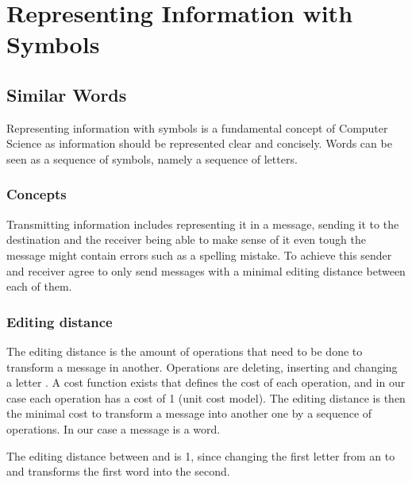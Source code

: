 \chapter{Representing Information with Symbols}
\label{chapter:representing_information_with_symbols}

\section{Similar Words}

Representing information with symbols is a fundamental concept of Computer Science as information should be represented clear and concisely. Words can be seen as a sequence of symbols, namely a sequence of letters.

\subsection{Concepts}

Transmitting information includes representing it in a message, sending it to the destination and the receiver being able to make sense of it even tough the message might contain errors such as a spelling mistake. To achieve this sender and receiver agree to only send messages with a minimal editing distance \cite{AnD} between each of them. 

\subsection*{Editing distance}

The editing distance is the amount of operations that need to be done to transform a message in another. Operations are deleting, inserting and changing a letter . A cost function exists that defines the cost of each operation, and in our case each operation has a cost of 1 (unit cost model). The editing distance is then the minimal cost to transform a message into another one by a sequence of operations. In our case a message is a word.

\begin{example}
    The editing distance between  and  is 1, since changing the first letter from an  to and  transforms the first word into the second.
\end{example}

